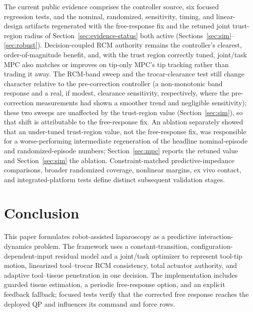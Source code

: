 The current public evidence comprises the controller source, six focused
regression tests, and the nominal, randomized, sensitivity, timing, and
linear-design artifacts regenerated with the free-response fix and the
retuned joint trust-region radius of
Section~\ref{sec:evidence-status} both active
(Sections~\ref{sec:sim}--\ref{sec:robust}). Decision-coupled RCM authority
remains the controller's clearest, order-of-magnitude benefit, and, with the
trust region correctly tuned, joint/task MPC also matches or improves on
tip-only MPC's tip tracking rather than trading it away. The RCM-band sweep
and the trocar-clearance test still change character relative to the
pre-correction controller (a non-monotonic band response and a real, if
modest, clearance sensitivity, respectively, where the pre-correction
measurements had shown a smoother trend and negligible sensitivity); these
two sweeps are unaffected by the trust-region value (Section~\ref{sec:sim}),
so that shift is attributable to the free-response fix. An ablation
separately showed that an under-tuned trust-region value, not the
free-response fix, was responsible for a worse-performing intermediate
regeneration of the headline nominal-episode and randomized-episode numbers;
Section~\ref{sec:mpc} reports the retuned value and Section~\ref{sec:sim}
the ablation. Constraint-matched
predictive-impedance comparisons, broader randomized coverage, nonlinear
margins, ex vivo contact, and integrated-platform tests define distinct
subsequent validation stages.

\section{Conclusion}\label{sec:conclusion}

This paper formulates robot-assisted laparoscopy as a predictive
interaction-dynamics problem. The framework uses a constant-transition,
configuration-dependent-input residual model and a joint/task optimizer to
represent tool-tip motion, linearized tool--trocar RCM consistency, total
actuator authority, and adaptive tool--tissue penetration in one decision.
The implementation includes guarded tissue estimation, a periodic
free-response option, and an explicit feedback fallback; focused tests verify
that the corrected free response reaches the deployed QP and influences its
command and force rows.

